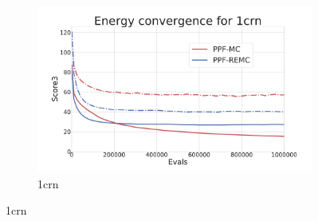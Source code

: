 \begin{figure}[ht]
\begin{subfigure}{0.7\linewidth}
    \includegraphics[width=1\linewidth]{Figuras/plots/energy_convergence/energy_convergence_1crn.pdf}
    \caption{1crn}
  \end{subfigure}
\end{figure}

